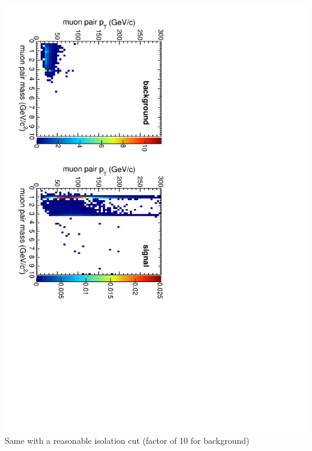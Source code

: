 \documentclass[compress]{beamer}
\begin{document}
\begin{frame}
\begin{columns}
\includegraphics[height=\linewidth, angle=90]{backgrounds_jpsiiso.pdf}
Same with a reasonable isolation cut (factor of 10 for background)
\end{columns}

\end{frame}
\end{document}

